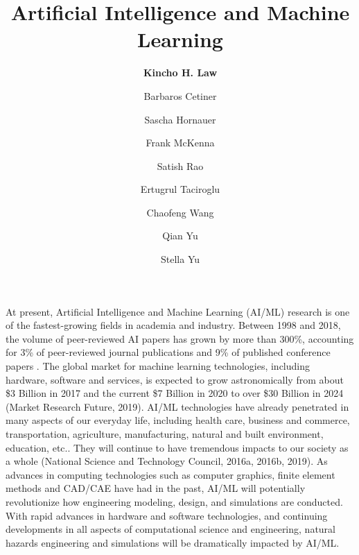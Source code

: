 %
%
%


\title{Artificial Intelligence and Machine Learning}
\author{
    \textbf{Kincho H. Law}
    \and {Barbaros Cetiner}
    \and {Sascha Hornauer}
    \and {Frank McKenna}
    \and {Satish Rao}
    \and {Ertugrul Taciroglu}
    \and {Chaofeng Wang}
    \and {Qian Yu}
    \and {Stella Yu}}
\tocauthor{}
%
%
\maketitle

At present, Artificial Intelligence and Machine Learning (AI/ML) research is one of the fastest-growing fields in academia and industry. Between 1998 and 2018, the volume of peer-reviewed AI papers has grown by more than 300\%, accounting for 3\% of peer-reviewed journal publications and 9\% of published conference papers \citep{perrault2019ai}. The global market for machine learning technologies, including hardware, software and services, is expected to grow astronomically from about \$3 Billion in 2017 and the current \$7 Billion in 2020 to over \$30 Billion in 2024 (Market Research Future, 2019). AI/ML technologies have already penetrated in many aspects of our everyday life, including health care, business and commerce, transportation, agriculture, manufacturing, natural and built environment, education, etc.. They will continue to have tremendous impacts to our society as a whole (National Science and Technology Council, 2016a, 2016b, 2019). As advances in computing technologies such as computer graphics, finite element methods and CAD/CAE have had in the past, AI/ML will potentially revolutionize how engineering modeling, design, and simulations are conducted. With rapid advances in hardware and software technologies, and continuing developments in all aspects of computational science and engineering, natural hazards engineering and simulations will be dramatically impacted by AI/ML.


